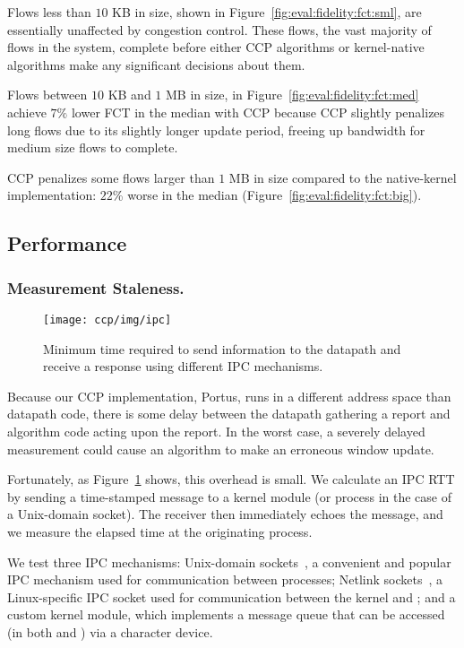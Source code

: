  Flows less than $10$ KB in size, shown in Figure~\ref{fig:eval:fidelity:fct:sml}, are essentially unaffected by congestion control. These flows, the vast majority of flows in the system, complete before either CCP algorithms or kernel-native algorithms make any significant decisions about them.

 Flows between $10$ KB and $1$ MB in size, in Figure~\ref{fig:eval:fidelity:fct:med}  achieve $7\%$ lower FCT in the median with CCP because CCP slightly penalizes long flows due to its slightly longer update period, freeing up bandwidth for medium size flows to complete.

 CCP penalizes some flows larger than $1$ MB in size compared to the native-kernel implementation: $22$\% worse in the median (Figure~\ref{fig:eval:fidelity:fct:big}).

\subsection{Performance}
\label{sec:eval:whyfold}

\subsubsection{Measurement Staleness.}
\label{sec:eval:whyfold:stale}
\begin{figure}[t]
\centering
    \texttt{[image: ccp/img/ipc]}
    \caption{Minimum time required to send information to the datapath and receive a response using different IPC mechanisms.}\label{fig:eval:ipc-latency}
\end{figure}

Because our CCP implementation, Portus, runs in a different address space than datapath code, there is some delay between the datapath gathering a report and algorithm code acting upon the report.
In the worst case, a severely delayed measurement could cause an algorithm to make an erroneous window update.

Fortunately, as Figure~\ref{fig:eval:ipc-latency} shows, this overhead is small. We calculate an IPC RTT by sending a time-stamped message to a kernel module (or \userspace{} process in the case of a Unix-domain socket). The receiver then immediately echoes the message, and we measure the elapsed time at the originating process.

We test three IPC mechanisms: Unix-domain sockets~\cite{unix-domain}, a convenient and popular IPC mechanism used for communication between \userspace{} processes; Netlink sockets~\cite{netlink}, a Linux-specific IPC socket used for communication between the kernel and \userspace{}; and a custom kernel module, which implements a message queue that can be accessed (in both \userspace{} and ) via a character device.

